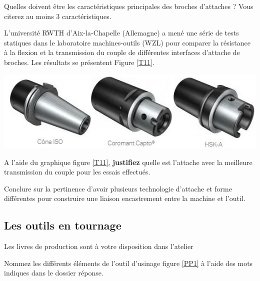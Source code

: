 \documentclass[12pt]{article}
\newcounter{exo}
\newenvironment{exo}{\stepcounter{exo}\vspace{0.5cm}{\bfseries Question \theexo\ :}}{\par\vspace{0.5cm}}
\begin{document}
\begin{exo} Quelles doivent être les caractéristiques principales des broches d'attaches ? Vous citerez au moins 3 caractéristiques.\end{exo}



L'université RWTH d'Aix-la-Chapelle (Allemagne) a mené une série de tests statiques dans le laboratoire machines-outils (WZL) pour comparer la résistance à la flexion et la transmission du couple de différentes interfaces d'attache de broches. Les résultats se présentent Figure \ref{T11}.

\includegraphics[width=0.9\linewidth]{Images/cone1.JPG}


\begin{exo} A l’aide du graphique figure \ref{T11}, \textbf{justifiez} quelle est l’attache avec la meilleure transmission du couple pour les essais effectués. \end{exo}



\begin{exo} Conclure sur la pertinence d'avoir plusieurs technologie d'attache et forme différentes pour construire une liaison encastrement entre la machine et l'outil.
\end{exo}

\subsection{Les outils en tournage}


\begin{tcolorbox}[colback=blue!5!white,colframe=red!75!black]
  \bcinfo Les livres de production sont à votre disposition dans l'atelier
\end{tcolorbox}

\begin{exo} Nommez les différents éléments de l’outil d’usinage figure \ref{PP1} à l'aide des mots
indiques dans le dossier réponse. \end{exo}
\end{document}
